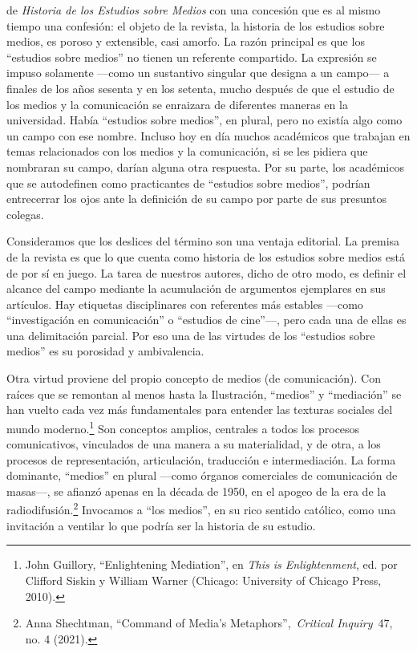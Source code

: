 \documentclass{tufte-handout}
\begin{document}
\begin{titlepage}
 de \emph{Historia de los Estudios sobre Medios}
con una concesión que es al mismo tiempo una confesión: el objeto de la
revista, la historia de los estudios sobre medios, es poroso y
extensible, casi amorfo. La razón principal es que los ``estudios sobre
medios'' no tienen un referente compartido. La expresión se impuso
solamente ---como un sustantivo singular que designa a un campo--- a
finales de los años sesenta y en los setenta, mucho después de que el
estudio de los medios y la comunicación se enraizara de diferentes
maneras en la universidad. Había ``estudios sobre medios'', en plural,
pero no existía algo como un campo con ese nombre. Incluso hoy en día
muchos académicos que trabajan en temas relacionados con los medios y la
comunicación, si se les pidiera que nombraran su campo, darían alguna
otra respuesta. Por su parte, los académicos que se autodefinen como
practicantes de ``estudios sobre medios'', podrían entrecerrar los ojos
ante la definición de su campo por parte de sus presuntos colegas. 


\enlargethispage{2\baselineskip}

\vspace*{2em}





 \end{titlepage}


Consideramos que los deslices del término son una ventaja editorial. La
premisa de la revista es que lo que cuenta como historia de los estudios
sobre medios está de por sí en juego. La tarea de nuestros autores,
dicho de otro modo, es definir el alcance del campo mediante la
acumulación de argumentos ejemplares en sus artículos. Hay etiquetas
disciplinares con referentes más estables ---como ``investigación en
comunicación'' o ``estudios de cine''---, pero cada una de ellas es una
delimitación parcial. Por eso una de las virtudes de los ``estudios
sobre medios'' es su porosidad y ambivalencia.

Otra virtud proviene del propio concepto de medios (de comunicación).
Con raíces que se remontan al menos hasta la Ilustración, ``medios'' y
``mediación'' se han vuelto cada vez más fundamentales para entender las
texturas sociales del mundo moderno.\footnote{John Guillory,
  ``Enlightening Mediation'', en \emph{This is Enlightenment}, ed. por
  Clifford Siskin y William Warner (Chicago: University of Chicago
  Press, 2010).} Son conceptos amplios, centrales a todos los procesos
comunicativos, vinculados de una manera a su materialidad, y de otra, a
los procesos de representación, articulación, traducción e
intermediación. La forma dominante, ``medios'' en plural ---como órganos
comerciales de comunicación de masas---, se afianzó apenas en la década
de 1950, en el apogeo de la era de la radiodifusión.\footnote{Anna
  Shechtman, ``Command of Media's Metaphors'',~\emph{Critical
  Inquiry}~47, no. 4 (2021).} Invocamos a ``los medios'', en su rico
sentido católico, como una invitación a ventilar lo que podría ser la
historia de su estudio.
\end{document}
